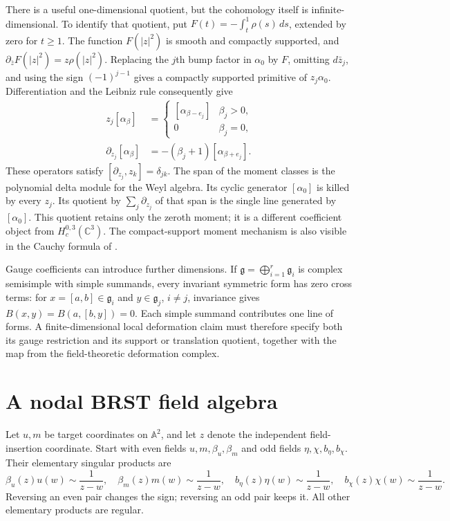 There is a useful one-dimensional quotient, but the cohomology itself
is infinite-dimensional.  To identify that quotient, put
$F(t)=-\int_t^1\rho(s)\,ds$, extended by zero for $t\geq1$.
The function $F(|z|^2)$ is smooth and compactly supported, and
$\partial_{\bar z}F(|z|^2)=z\rho(|z|^2)$.  Replacing the $j$th bump
factor in $\alpha_0$ by $F$, omitting $d\bar z_j$, and using the sign
$(-1)^{j-1}$ gives a compactly supported primitive of $z_j\alpha_0$.
Differentiation and the Leibniz rule consequently give
\begin{equation}\label{cyquant:eq:moment-weyl}
 \begin{aligned}
 z_j[\alpha_\beta]&=
 \begin{cases}[\alpha_{\beta-e_j}]&\beta_j>0,\\0&\beta_j=0,\end{cases}\\
 \partial_{z_j}[\alpha_\beta]&=-(\beta_j+1)[\alpha_{\beta+e_j}].
 \end{aligned}
\end{equation}
These operators satisfy $[\partial_{z_j},z_k]=\delta_{jk}$.
The span of the moment classes is the polynomial delta module for the
Weyl algebra.  Its cyclic generator $[\alpha_0]$ is killed by every $z_j$.
Its quotient by $\sum_j\partial_{z_j}$ of that span is the single line
generated by $[\alpha_0]$.  This quotient retains only the zeroth moment;
it is a different coefficient object from $H_c^{0,3}(\mathbb C^3)$.
The compact-support moment mechanism is also visible in the Cauchy
formula of \cite[Ch.~I, \S3]{cyquant:Demailly}.

Gauge coefficients can introduce further dimensions.  If
$\mathfrak g=\bigoplus_{i=1}^r\mathfrak g_i$ is complex semisimple with
simple summands, every invariant symmetric form has zero cross terms:
for $x=[a,b]\in\mathfrak g_i$ and $y\in\mathfrak g_j$, $i\ne j$,
invariance gives $B(x,y)=B(a,[b,y])=0$.  Each simple summand contributes
one line of forms.  A finite-dimensional local deformation claim must
therefore specify both its gauge restriction and its support or
translation quotient, together with the map from the field-theoretic
deformation complex.

\section{A nodal BRST field algebra}
\label{cyquant:sec:nodal}

Let $u,m$ be target coordinates on $\mathbb A^2$, and let $z$ denote
the independent field-insertion coordinate.  Start with even fields
$u,m,\beta_u,\beta_m$ and odd fields $\eta,\chi,b_\eta,b_\chi$.
Their elementary singular products are
\begin{equation}\label{cyquant:eq:nodal-oscillators}
 \beta_u(z)u(w)\sim\frac1{z-w},\quad
 \beta_m(z)m(w)\sim\frac1{z-w},\quad
 b_\eta(z)\eta(w)\sim\frac1{z-w},\quad
 b_\chi(z)\chi(w)\sim\frac1{z-w}.
\end{equation}
Reversing an even pair changes the sign; reversing an odd pair keeps
it.  All other elementary products are regular.

